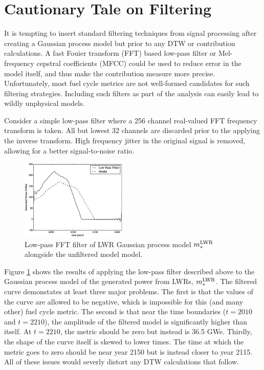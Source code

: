 \clearpage
\section{Cautionary Tale on Filtering}
\label{filtering}

It is tempting to insert standard filtering techniques from signal processing 
after creating a Gaussian process model but prior to any DTW or contribution 
calculations. A fast Fouier transform (FFT) \citeme based low-pass filter or 
Mel-frequency cepstral coefficients (MFCC) \citeme could be used to reduce error 
in the model itself, 
and thus make the contribution measure more precise. Unfortunately, most 
fuel cycle metrics are not well-formed candidates for such filtering strategies.
Including such filters as part of the analysis can easily lead to wildly unphysical
models.

Consider a simple low-pass filter where a 256 channel real-valued FFT frequency 
transform is taken.  All but lowest 32 channels are discarded prior to the applying 
the inverse transform. High frequency jitter in the original signal is removed, 
allowing for a better signal-to-noise ratio.

\begin{figure}[htb]
\centering
\includegraphics[width=0.45\textwidth]{fft-lwr-model.eps}
\caption{Low-pass FFT filter of LWR Gaussian process model $m_*^{\mathrm{LWR}}$ alongside
the unfiltered model model.}
\label{fft-lwr-model}
\end{figure}

Figure \ref{fft-lwr-model} shows the results of applying the low-pass filter 
described above to the Gaussian process model of the generated power from LWRs, 
$m_*^{\mathrm{LWR}}$.  The filtered curve demonstates at least three major problems.  The
first is that the values of the curve are allowed to be negative, which is 
impossible for this (and many other) fuel cycle metric.  The second is that 
near the time boundaries ($t=2010$ and $t=2210$), the amplitude of the filtered model
is significantly higher than itself. At $t=2210$, the metric should be zero but
instead is 36.5 GWe. Thirdly, the shape of the curve itself is skewed to lower 
times. The time at which the metric goes to zero should be near year 2150 but is 
instead closer to year 2115.  All of these issues would severly distort any 
DTW calculations that follow.

